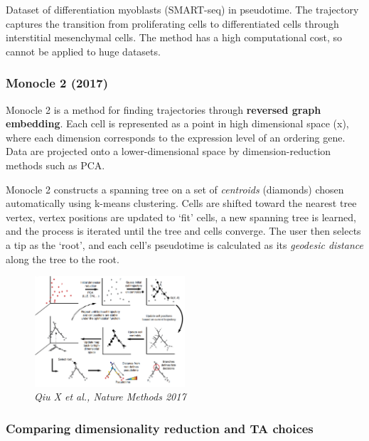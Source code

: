 Dataset of differentiation myoblasts (SMART-seq) in pseudotime. The
trajectory captures the transition from proliferating cells to
differentiated cells through interstitial mesenchymal cells. The method
has a high computational cost, so cannot be applied to huge datasets.

\hypertarget{monocle-2-2017}{%
\subsubsection{Monocle 2 (2017)}\label{monocle-2-2017}}

Monocle 2 is a method for finding trajectories through \textbf{reversed
graph embedding}. Each cell is represented as a point in high
dimensional space (x), where each dimension corresponds to the
expression level of an ordering gene. Data are projected onto a
lower-dimensional space by dimension-reduction methods such as PCA.

Monocle 2 constructs a spanning tree on a set of \emph{centroids}
(diamonds) chosen automatically using k-means clustering. Cells are
shifted toward the nearest tree vertex, vertex positions are updated to
`fit' cells, a new spanning tree is learned, and the process is iterated
until the tree and cells converge. The user then selects a tip as the
`root', and each cell's pseudotime is calculated as its \emph{geodesic
distance} along the tree to the root.

\begin{figure}
\centering
\includegraphics[width=0.5\textwidth]{images/Screen_Shot_2023-02-22_at_19-13-32.png}
\caption{\emph{Qiu X et al., Nature Methods 2017}}
\end{figure}


\hypertarget{comparing-dimensionality-reduction-and-ta-choices}{%
\subsubsection{Comparing dimensionality reduction and TA
choices}\label{comparing-dimensionality-reduction-and-ta-choices}}

